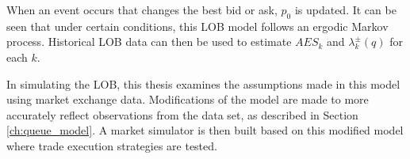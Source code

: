 When an event occurs that changes the best bid or ask, $p_0$ is updated. It can be seen that under certain conditions, this LOB model follows an ergodic Markov process. Historical LOB data can then be used to estimate $AES_k$ and $\lambda^{\pm}_k(q)$ for each $k$.

In simulating the LOB, this thesis examines the assumptions made in this model using market exchange data. Modifications of the model are made to more accurately reflect observations from the data set, as described in Section \ref{ch:queue_model}. A market simulator is then built based on this modified model where trade execution strategies are tested.